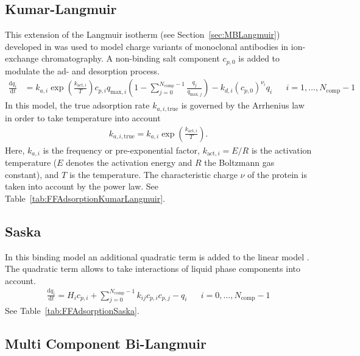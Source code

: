 \subsection{Kumar-Langmuir}

This extension of the Langmuir isotherm (see Section~\ref{sec:MBLangmuir}) developed in \cite{Kumar2015} was used to model charge variants of monoclonal antibodies in ion-exchange chromatography. 
A non-binding salt component $c_{p,0}$ is added to modulate the ad- and desorption process.
\begin{align*}
  \frac{\mathrm{d} q_i}{\mathrm{d} t} &= k_{a,i} \exp\left( \frac{k_{\text{act},i}}{T} \right) c_{p,i} q_{\text{max},i} \left( 1 - \sum_{j=0}^{N_{\text{comp}} - 1} \frac{q_j}{q_{\text{max},j}} \right) - k_{d,i} \left( c_{p,0} \right)^{\nu_i} q_i && i = 1, \dots, N_{\text{comp}} - 1
\end{align*}
In this model, the true adsorption rate $k_{a,i,\text{true}}$ is governed by the Arrhenius law in order to take temperature into account
\begin{align*}
  k_{a,i,\text{true}} = k_{a,i} \exp\left( \frac{k_{\text{act},i}}{T} \right).
\end{align*}
Here, $k_{a,i}$ is the frequency or pre-exponential factor, $k_{\text{act},i} = E / R$ is the activation temperature ($E$ denotes the activation energy and $R$ the Boltzmann gas constant), and $T$ is the temperature.
The characteristic charge $\nu$ of the protein is taken into account by the power law.
See Table~\ref{tab:FFAdsorptionKumarLangmuir}.

\subsection{Saska}

In this binding model an additional quadratic term is added to the linear model \cite{Saska1992}. 
The quadratic term allows to take interactions of liquid phase components into account.
\begin{align*}
  \frac{\mathrm{d} q_i}{\mathrm{d} t} = H_i c_{p,i} + \sum_{j=0}^{N_{\text{comp}} - 1} k_{ij} c_{p,i} c_{p,j} - q_i && i = 0, \dots, N_{\text{comp}} - 1
\end{align*}
See Table~\ref{tab:FFAdsorptionSaska}.

\subsection{Multi Component Bi-Langmuir}\label{sec:MBBiLangmuir}

